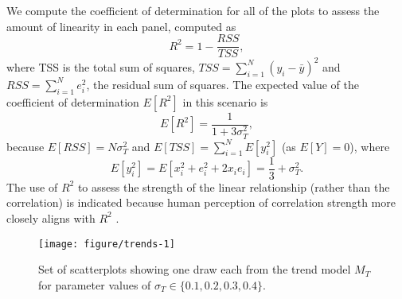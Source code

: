 \documentclass[12pt]{article}\usepackage[]{graphicx}\usepackage[]{color}
\newenvironment{knitrout}{}{} %
\begin{document}
We compute the coefficient of determination for all of the plots to assess the amount of linearity in each panel, computed as 
\begin{equation}\label{eq:linearMeasure}
R^2 = 1 - \frac{RSS}{TSS},
\end{equation}
where TSS is the total sum of squares, $TSS = \sum_{i=1}^N \left(y_i - \bar{y}\right)^2$ and $RSS = \sum_{i=1}^N e_i^2$, the residual sum of squares.
The expected value of the coefficient of determination $E\left[R^2\right]$ in this scenario is 
\[
E\left[R^2\right] =  \frac{1}{1 + 3\sigma^2_T},
\]
because
$E[RSS] = N\sigma^2_T$ and $E[TSS] = \sum_{i=1}^N E\left[y_i^2\right]$  (as $E[Y] = 0$), where 
$$
E\left[y_i^2\right] = E\left[x_i^2 + e_i^2 + 2 x_ie_i\right] = \frac{1}{3} + \sigma^2_T. 
$$
The use of $R^2$ to assess the strength of the linear relationship (rather than the correlation) is indicated because human perception of correlation strength more closely aligns with $R^2$ \citep{bobko1979perception,lewandowsky1989perception}. 

\begin{figure}[ht]
\begin{knitrout}
\color{fgcolor}

{\centering \texttt{[image: figure/trends-1]} 

}



\end{knitrout}
\caption[Parameters affecting $M_T$]{\label{fig:trends} Set of scatterplots showing one draw each from the trend model $M_T$ for parameter values of  $\sigma_T \in \{0.1, 0.2, 0.3, 0.4\}$.}
\end{figure}
\end{document}
